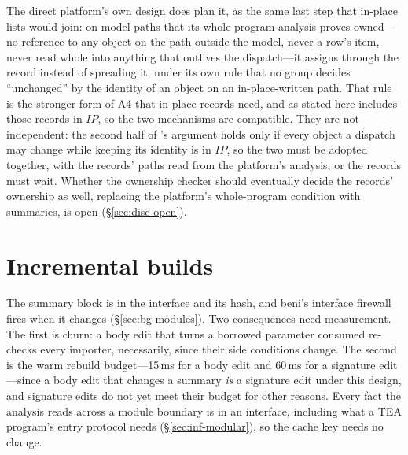 The direct platform's own design does plan it, as the same last step that in-place lists would join: on
model paths that its whole-program analysis proves owned---no reference to any object on the path outside
the model, never a row's item, never read whole into anything that outlives the dispatch---it assigns
through the record instead of spreading it, under its own rule that no group decides ``unchanged'' by the
identity of an object on an in-place-written path. That rule is the stronger form of A4 that in-place
records need, and  as stated here includes those records in $\mathit{IP}$, so the two mechanisms are
compatible. They are not independent: the second half of 's argument holds only if every object a
dispatch may change while keeping its identity is in $\mathit{IP}$, so the two must be adopted together,
with the records' paths read from the platform's analysis, or the records must wait. Whether the
ownership checker should eventually decide the records' ownership as well, replacing the platform's
whole-program condition with summaries, is open (\S\ref{sec:disc-open}).

\section{Incremental builds}
\label{sec:compiler-incremental}

The summary block is in the interface and its hash, and beni's interface firewall fires when it
changes (\S\ref{sec:bg-modules}). Two consequences need measurement. The first is churn: a body edit
that turns a borrowed parameter consumed re-checks every importer, necessarily, since their side
conditions change. The second is the warm rebuild budget---15\,ms for a body edit and 60\,ms for a
signature edit---since a body edit that changes a summary \emph{is} a signature edit under this design,
and signature edits do not yet meet their budget for other reasons. Every fact the analysis reads
across a module boundary is in an interface, including what a TEA program's entry protocol needs
(\S\ref{sec:inf-modular}), so the cache key needs no change.
